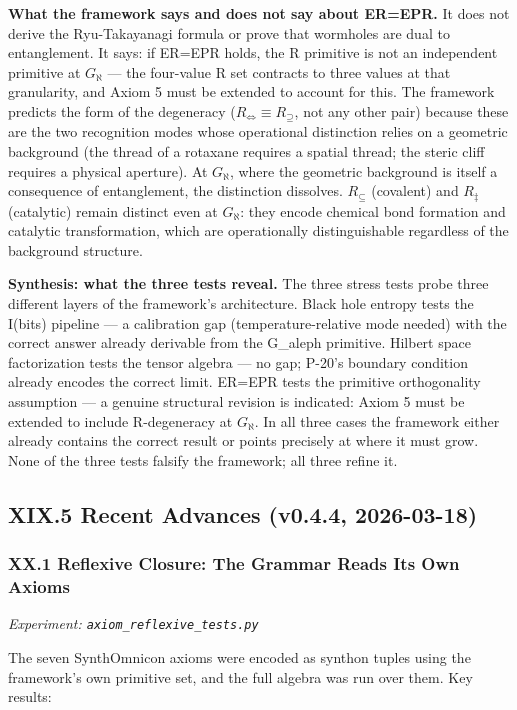 \documentclass[12pt,a4paper]{article}
\begin{document}
\textbf{What the framework says and does not say about ER=EPR.} It does not derive the Ryu-Takayanagi formula or prove that wormholes are dual to entanglement. It says: if ER=EPR holds, the R primitive is not an independent primitive at $G_{\aleph}$ --- the four-value R set contracts to three values at that granularity, and Axiom 5 must be extended to account for this. The framework predicts the form of the degeneracy ($R_{\Leftrightarrow} \equiv R_{\supseteq}$, not any other pair) because these are the two recognition modes whose operational distinction relies on a geometric background (the thread of a rotaxane requires a spatial thread; the steric cliff requires a physical aperture). At $G_{\aleph}$, where the geometric background is itself a consequence of entanglement, the distinction dissolves. $R_{\subseteq}$ (covalent) and $R_{\ddagger}$ (catalytic) remain distinct even at $G_{\aleph}$: they encode chemical bond formation and catalytic transformation, which are operationally distinguishable regardless of the background structure.

\textbf{Synthesis: what the three tests reveal.} The three stress tests probe three different layers of the framework's architecture. Black hole entropy tests the I(bits) pipeline --- a calibration gap (temperature-relative mode needed) with the correct answer already derivable from the G\_aleph primitive. Hilbert space factorization tests the tensor algebra --- no gap; P-20's boundary condition already encodes the correct limit. ER=EPR tests the primitive orthogonality assumption --- a genuine structural revision is indicated: Axiom 5 must be extended to include R-degeneracy at $G_{\aleph}$. In all three cases the framework either already contains the correct result or points precisely at where it must grow. None of the three tests falsify the framework; all three refine it.

\subsection{XIX.5 Recent Advances (v0.4.4, 2026-03-18)}

\subsubsection{XX.1 Reflexive Closure: The Grammar Reads Its Own Axioms}

\emph{Experiment: \texttt{axiom\_reflexive\_tests.py}}

The seven SynthOmnicon axioms were encoded as synthon tuples using the framework's own primitive set, and the full algebra was run over them. Key results:
\end{document}
